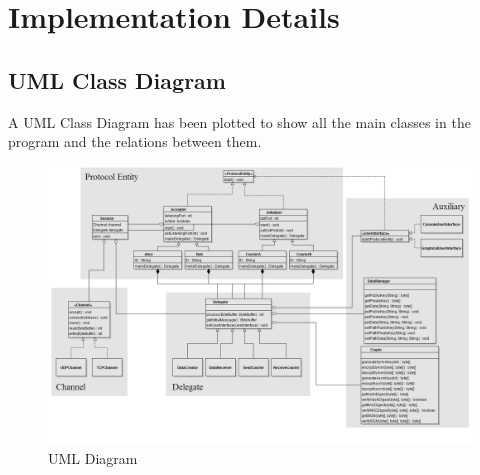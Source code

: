 \section{Implementation Details}
\subsection{UML Class Diagram}
A UML Class Diagram has been plotted to show all the main classes in the program and the relations between them.
\begin{figure}[h!]
\centering
\includegraphics[width=\textwidth,natwidth=1416,natheight=935]{figures/umldiagram.jpg}
\caption{UML Diagram}
\end{figure}

